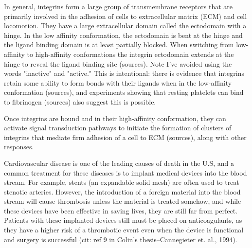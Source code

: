 In general, integrins form a large group of transmembrane receptors
that are primarily involved in the adhesion of cells to extracellular
matrix (ECM) and cell locomotion. They have a large extracellular
domain called the ectodomain with a hinge. In the low affinity
conformation, the ectodomain is bent at the hinge and the ligand
binding domain is at least partially blocked. When switching from
low-affinity to high-affinity conformations the integrin ectodomain
extends at the hinge to reveal the ligand binding site (sources). Note
I've avoided using the words "inactive" and "active." This is
intentional: there is evidence that integrins retain some ability to
form bonds with their ligands when in the low-affinity conformation
(sources), and experiments showing that resting platelets can bind to
fibrinogen (sources) also suggest this is possible.
		
Once integrins are bound and in their high-affinity conformation, they
can activate signal transduction pathways to initiate the formation of
clusters of integrins that mediate firm adhesion of a cell to ECM
(sources), along with other responses.
	




Cardiovascular disease is one of the leading causes of death in the
U.S, and a common treatment for these diseases is to implant medical
devices into the blood stream. For example, stents (an expandable
solid mesh) are often used to treat stenotic arteries. However, the
introduction of a foreign material into the blood stream will cause
thrombosis unless the material is treated somehow, and while these
devices have been effective in saving lives, they are still far from
perfect. Patients with these implanted devices still must be placed on
anticoagulants, as they have a higher risk of a thrombotic event even
when the device is functional and surgery is successful (cit: ref 9 in
Colin's thesis--Cannegieter et. al., 1994).
		
